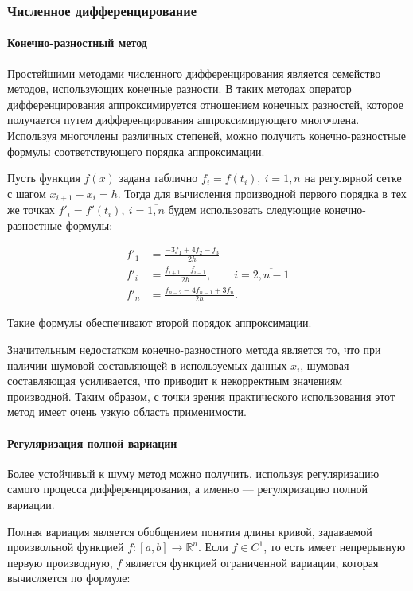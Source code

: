 \subsubsection{Численное дифференцирование}

\paragraph{Конечно-разностный метод}

Простейшими методами численного дифференцирования является семейство методов, использующих конечные разности. В таких методах оператор дифференцирования аппроксимируется отношением конечных разностей, которое получается путем дифференцирования аппроксимирующего многочлена. Используя многочлены различных степеней, можно получить конечно-разностные формулы соответствующего порядка аппроксимации.

Пусть функция $f(x)$ задана таблично $f_i = f(t_i),\ i = \overline{1, n}$ на регулярной сетке с шагом $x_{i+1} - x_i = h$. Тогда для вычисления производной первого порядка в тех же точках $f'_i = f'(t_i),\ i = \overline{1, n}$ будем использовать следующие конечно-разностные формулы:

\begin{align}
f'_1 &= \frac{-3 f_1 + 4 f_2 - f_3}{2 h} \\
f'_i &= \frac{f_{i+1} - f_{i-1}}{2 h}, \qquad i = \overline{2, n-1} \\
f'_n &= \frac{f_{n-2} - 4 f_{n-1} + 3 f_n}{2 h}.
\end{align}

Такие формулы обеспечивают второй порядок аппроксимации.

Значительным недостатком конечно-разностного метода является то, что при наличии шумовой составляющей в используемых данных $x_i$, шумовая составляющая усиливается, что приводит к некорректным значениям производной. Таким образом, с точки зрения практического использования этот метод имеет очень узкую область применимости.

\paragraph{Регуляризация полной вариации}

Более устойчивый к шуму метод можно получить, используя регуляризацию самого процесса дифференцирования, а именно --- регуляризацию полной вариации.

Полная вариация является обобщением понятия длины кривой, задаваемой произвольной функцией $f: [a, b] \rightarrow \mathbb{R}^n$. Если $f \in C^1$, то есть имеет непрерывную первую производную, $f$ является функцией ограниченной вариации, которая вычисляется по формуле:

